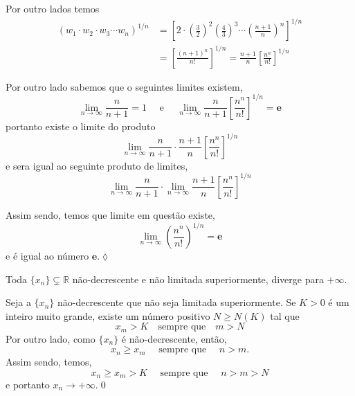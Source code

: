 Por outro lados temos
\begin{align}
 (w_1\cdot w_2\cdot w_3\cdots w_n)^{1/n}&=\left[2\cdot\left(\frac{3}{2}\right)^2\left(\frac{4}{3}\right)^3\cdots\left(\frac{n+1}{n}\right)^n\right]^{1/n}\nonumber\\[2ex]
          &=\left[\frac{(n+1)^n}{n!}\right]^{1/n}=\frac{n+1}{n}\left[\frac{n^n}{n!}\right]^{1/n}\label{neper003}
\end{align}

Por outro lado sabemos que o seguintes limites existem,
\begin{equation*}
    \lim_{n\to\infty}\frac{n}{n+1}=1\quad \text{ e }\quad \lim_{n\to\infty}\frac{n}{n+1}\left[\frac{n^n}{n!}\right]^{1/n}=\mathbf{e}
\end{equation*}
portanto existe o limite  do produto
\begin{equation*}
   \lim_{n\to\infty}\frac{n}{n+1}\cdot\frac{n+1}{n}\left[\frac{n^n}{n!}\right]^{1/n}
\end{equation*}
e sera igual ao seguinte produto de limites,
\begin{equation*}
   \lim_{n\to\infty}\frac{n}{n+1}\cdot\lim_{n\to\infty}\frac{n+1}{n}\left[\frac{n^n}{n!}\right]^{1/n}
\end{equation*}

Assim sendo, temos que limite em quest\~{a}o existe,
\begin{equation*}
    \lim_{n\to\infty}\left(\frac{n^n}{n!} \right)^{1/n}=\mathbf{e}
\end{equation*}
e \'{e} igual ao n\'{u}mero $\mathbf{e}$.\hfill \(\lozenge\)

\begin{fteo}
Toda \seq $\{x_n\}\subsetneq \mathbb{R}$ n\~{a}o-decrescente e n\~{a}o limitada superiormente, diverge para $+\infty$.
\end{fteo}

\prova Seja a \seq $\{x_n\}$ n\~{a}o-decrescente que n\~{a}o seja limitada superiormente. Se $K>0$ \'{e} um inteiro muito grande, existe um n\'{u}mero positivo $N \geq N(K)$ tal que
\begin{equation*}
    x_m>K \quad \text{sempre que}\quad  m>N
\end{equation*}
Por outro lado, como $\{x_n\}$ \'{e} n\~{a}o-decrescente, ent\~{a}o,
\begin{equation*}
    x_n\geq x_m\quad \text{ sempre que }\quad n > m.
\end{equation*}
Assim sendo, temos,
\begin{equation*}
    x_n\geq x_m>K \quad \text{ sempre que } \quad  n > m >N
\end{equation*}
e portanto $x_n\to +\infty$.\qed



